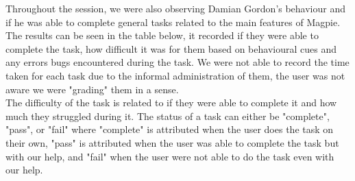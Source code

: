 Throughout the session, we were also observing Damian Gordon's behaviour and if he was able to complete general tasks related to the main features of Magpie. The results can be seen in the table below, it recorded if they were able to complete the task, how difficult it was for them based on behavioural cues and any errors bugs encountered during the task. We were not able to record the time taken for each task due to the informal administration of them, the user was not aware we were "grading" them in a sense.\\
The difficulty of the task is related to if they were able to complete it and how much they struggled during it. The status of a task can either be "complete", "pass", or "fail" where "complete" is attributed when the user does the task on their own, "pass" is attributed when the user was able to complete the task but with our help, and "fail" when the user were not able to do the task even with our help. \\
